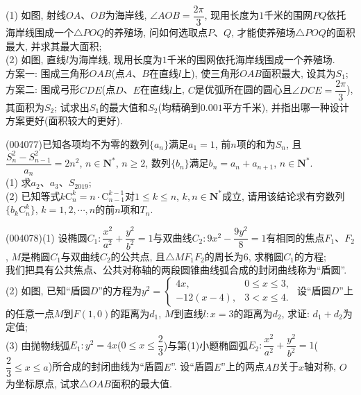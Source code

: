 (1) 如图, 射线$OA$、$OB$为海岸线, $\angle AOB=\dfrac{2\pi}3$, 现用长度为$1$千米的围网$PQ$依托海岸线围成一个$\triangle POQ$的养殖场, 问如何选取点$P$、$Q$, 才能使养殖场$\triangle POQ$的面积最大, 并求其最大面积;\\
(2) 如图, 直线$l$为海岸线, 现用长度为$1$千米的围网依托海岸线围成一个养殖场.\\
方案一: 围成三角形$OAB$(点$A$、$B$在直线$l$上), 使三角形$OAB$面积最大, 设其为$S_1$;\\
方案二: 围成弓形$CDE$(点$D$、$E$在直线$l$上, $C$是优弧所在圆的圆心且$\angle DCE=\dfrac{2\pi }3$), 其面积为$S_2$;
试求出$S_1$的最大值和$S_2$(均精确到$0.001$平方千米), 并指出哪一种设计方案更好(面积较大的更好).
\item (004077)已知各项均不为零的数列$\{a_n\}$满足$a_1=1$, 前$n$项的和为$S_n$, 且$\dfrac{S_n^2-S_{n-1}^2}{a_n}=2n^2$,
$n\in \mathbf{N}^*$, $n\ge 2$, 数列$\{b_n\}$满足$b_n=a_n+a_{n+1}$, $n\in \mathbf{N}^*$.\\
(1) 求$a_2$、$a_3$、$S_{2019}$;\\
(2) 已知等式$k\mathrm{C}_n^k=n\cdot \mathrm{C}_{n-1}^{k-1}$对$1\le k\le n$, $k,n\in \mathbf{N}^*$成立, 请用该结论求有穷数列$\{b_k\mathrm{C}_n^k\}$, $k=1,2,\cdots,n$的前$n$项和$T_n$.
\item (004078)(1) 设椭圆$C_1:\dfrac{x^2}{a^2}+\dfrac{y^2}{b^2}=1$与双曲线$C_2:9{x^2}-\dfrac{9y^2}8=1$有相同的焦点$F_1$、$F_2$, $M$是椭圆$C_1$与双曲线$C_2$的公共点, 且$\triangle MF_1F_2$的周长为$6$, 求椭圆$C_1$的方程;\\
我们把具有公共焦点、公共对称轴的两段圆锥曲线弧合成的封闭曲线称为``盾圆''.\\
(2) 如图, 已知``盾圆$D$''的方程为$y^2=\begin{cases}
4x, &  0\le x\le 3,\\ -12(x-4), & 3<x\le 4.  \end{cases}$ 设``盾圆$D$''上的任意一点$M$到$F(1,0)$的距离为$d_1$, $M$到直线$l:x=3$的距离为$d_2$, 求证: $d_1+d_2$为定值;\\
(3) 由抛物线弧$E_1:y^2=4x$($0\le x\le \dfrac 23$)与第(1)小题椭圆弧$E_2:\dfrac{x^2}{a^2}+\dfrac{y^2}{b^2}=1$($\dfrac 23\le x\le a$)所合成的封闭曲线为``盾圆$E$''. 设``盾圆$E$''上的两点$AB$关于$x$轴对称, $O$为坐标原点, 试求$\triangle OAB$面积的最大值.
\begin{center}
\end{center}
